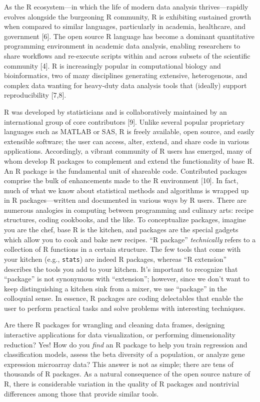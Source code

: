 \documentclass[10pt,letterpaper]{article}
\begin{document}
As the R ecosystem---in which the life of modern data analysis
thrives---rapidly evolves alongside the burgeoning R community, R is
exhibiting sustained growth when compared to similar languages,
particularly in academia, healthcare, and government {[}6{]}. The open
source R language has become a dominant quantitative programming
environment in academic data analysis, enabling researchers to share
workflows and re-execute scripts within and across subsets of the
scientific community {[}4{]}. R is increasingly popular in computational
biology and bioinformatics, two of many disciplines generating
extensive, heterogenous, and complex data wanting for heavy-duty data
analysis tools that (ideally) support reproducibility {[}7,8{]}.

R was developed by statisticians and is collaboratively maintained by an
international group of core contributors {[}9{]}. Unlike several popular
proprietary languages such as MATLAB or SAS, R is freely available, open
source, and easily extensible software; the user can access, alter,
extend, and share code in various applications. Accordingly, a vibrant
community of R users has emerged, many of whom develop R packages to
complement and extend the functionality of base R. An R package is the
fundamental unit of shareable code. Contributed packages comprise the
bulk of enhancements made to the R environment {[}10{]}. In fact, much
of what we know about statistical methods and algorithms is wrapped up
in R packages---written and documented in various ways by R users. There
are numerous analogies in computing between programming and culinary
arts: recipe structures, coding cookbooks, and the like. To
conceptualize packages, imagine you are the chef, base R is the kitchen,
and packages are the special gadgets which allow you to cook and bake
new recipes. ``R package'' \emph{technically} refers to a collection of
R functions in a certain structure. The few tools that come with your
kitchen (e.g., \texttt{stats}) are indeed R packages, whereas ``R
extension'' describes the tools you add to your kitchen. It's important
to recognize that ``package'' is not synonymous with ``extension'';
however, since we don't want to keep distinguishing a kitchen sink from
a mixer, we use ``package'' in the colloquial sense. In essence, R
packages are coding delectables that enable the user to perform
practical tasks and solve problems with interesting techniques.

Are there R packages for wrangling and cleaning data frames, designing
interactive applications for data visualization, or performing
dimensionality reduction? Yes! How do you \emph{find} an R package to
help you train regression and classification models, assess the beta
diversity of a population, or analyze gene expression microarray data?
This answer is not as simple; there are tens of thousands of R packages.
As a natural consequence of the open source nature of R, there is
considerable variation in the quality of R packages and nontrivial
differences among those that provide similar tools.
\end{document}
